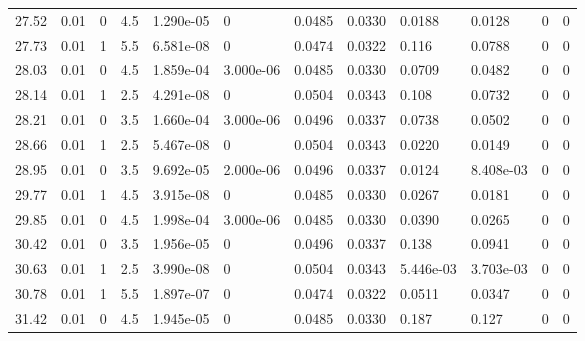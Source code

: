 \documentclass[preview]{standalone}
\begin{document}
{{{\begin{tabular}{L{1.2cm}C{1.2cm} C{0.3cm}C{0.5cm} C{1.4cm}C{1.4cm} C{1.4cm}C{1.4cm} C{1.6cm}C{1.6cm} C{1.6cm}C{1.6cm}}
  27.52  &  0.01  & 0     & 4.5 &  1.290e-05  & 0  &  0.0485&   0.0330& 0.0188 & 0.0128   &  0 & 0  \\ 
  27.73  &  0.01  & 1     & 5.5 &  6.581e-08  & 0  &  0.0474&   0.0322& 0.116 & 0.0788   &  0 & 0  \\ 
  28.03  &  0.01  & 0     & 4.5 &  1.859e-04  & 3.000e-06  &  0.0485&   0.0330& 0.0709 & 0.0482   &  0 & 0  \\ 
  28.14  &  0.01  & 1     & 2.5 &  4.291e-08  & 0  &  0.0504&   0.0343& 0.108 & 0.0732   &  0 & 0  \\ 
  28.21  &  0.01  & 0     & 3.5 &  1.660e-04  & 3.000e-06  &  0.0496&   0.0337& 0.0738 & 0.0502   &  0 & 0  \\ 
  28.66  &  0.01  & 1     & 2.5 &  5.467e-08  & 0  &  0.0504&   0.0343& 0.0220 & 0.0149   &  0 & 0  \\ 
  28.95  &  0.01  & 0     & 3.5 &  9.692e-05  & 2.000e-06  &  0.0496&   0.0337& 0.0124 & 8.408e-03   &  0 & 0  \\ 
  29.77  &  0.01  & 1     & 4.5 &  3.915e-08  & 0  &  0.0485&   0.0330& 0.0267 & 0.0181   &  0 & 0  \\ 
  29.85  &  0.01  & 0     & 4.5 &  1.998e-04  & 3.000e-06  &  0.0485&   0.0330& 0.0390 & 0.0265   &  0 & 0  \\ 
  30.42  &  0.01  & 0     & 3.5 &  1.956e-05  & 0  &  0.0496&   0.0337& 0.138 & 0.0941   &  0 & 0  \\ 
  30.63  &  0.01  & 1     & 2.5 &  3.990e-08  & 0  &  0.0504&   0.0343& 5.446e-03 & 3.703e-03   &  0 & 0  \\ 
  30.78  &  0.01  & 1     & 5.5 &  1.897e-07  & 0  &  0.0474&   0.0322& 0.0511 & 0.0347   &  0 & 0  \\ 
  31.42  &  0.01  & 0     & 4.5 &  1.945e-05  & 0  &  0.0485&   0.0330& 0.187 & 0.127   &  0 & 0  \\ 
\hline 
\end{tabular} 

}}}
\end{document}
